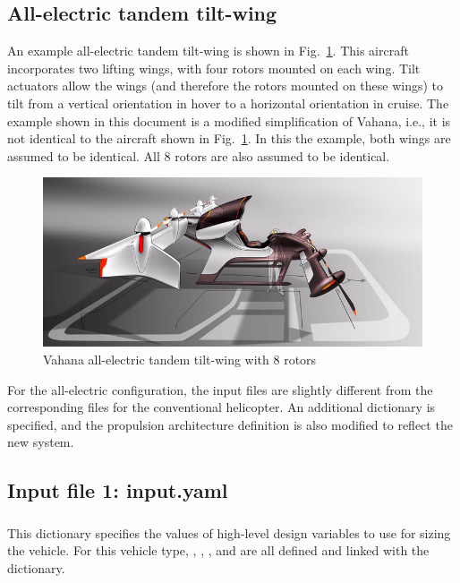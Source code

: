 \subsection{All-electric tandem tilt-wing}
An example all-electric tandem tilt-wing is shown in Fig.~\ref{fig:vahana}. This aircraft incorporates two lifting wings, with four rotors mounted on each wing. Tilt actuators allow the wings (and therefore the rotors mounted on these wings) to tilt from a vertical orientation in hover to a horizontal orientation in cruise. The example shown in this document is a modified simplification of Vahana, i.e., it is not identical to the aircraft shown in Fig.~\ref{fig:vahana}. In this the example, both wings are assumed to be identical. All 8 rotors are also assumed to be identical. 

\begin{figure}[H]
\begin{center}
\includegraphics[width=\textwidth]{images/vahana_picture.png}
\caption{Vahana all-electric tandem tilt-wing with 8 rotors}
\label{fig:vahana}
\end{center}
\end{figure}

For the all-electric configuration, the input files are slightly different from the corresponding files for the conventional helicopter. An additional  dictionary is specified, and the propulsion architecture definition is also modified to reflect the new system. 
\subsection*{Input file 1: input.yaml}

\subsubsection{}
This dictionary specifies the values of high-level design variables to use for sizing the vehicle. For this vehicle type, , , ,  and  are all defined and linked with the  dictionary.

